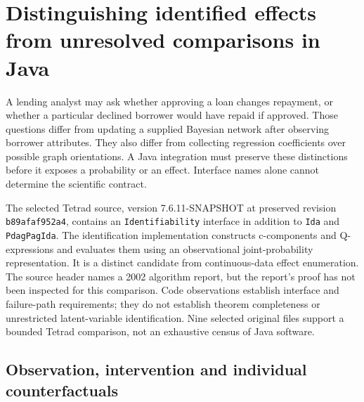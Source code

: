 \section{Distinguishing identified effects from unresolved comparisons in Java}
\label{exec19:javaid-scope}

A lending analyst may ask whether approving a loan changes repayment, or whether
a particular declined borrower would have repaid if approved. Those questions
differ from updating a supplied Bayesian network after observing borrower
attributes. They also differ from collecting regression coefficients over
possible graph orientations. A Java integration must preserve these distinctions
before it exposes a probability or an effect. Interface names alone cannot
determine the scientific contract.

The selected Tetrad source, version 7.6.11-SNAPSHOT at preserved revision
\texttt{b89afaf952a4}, contains an \texttt{Identifiability} interface in addition
to \texttt{Ida} and \texttt{PdagPagIda}. The identification implementation
constructs c-components and Q-expressions and evaluates them using an
observational joint-probability representation. It is a distinct candidate
from continuous-data effect enumeration. The source header names a 2002
algorithm report, but the report's proof has not been inspected for this
comparison. Code observations establish interface and failure-path requirements;
they do not establish theorem completeness or unrestricted latent-variable
identification. Nine selected original files support a bounded Tetrad comparison,
not an exhaustive census of Java software.~\citep{exec19_javaid_source}

\subsection{Observation, intervention and individual counterfactuals}
\label{exec19:javaid-witnesses}

